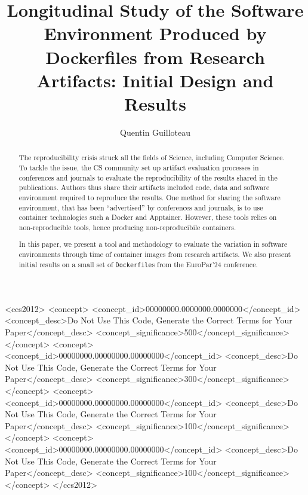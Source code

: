 \documentclass[sigconf,natbib=false]{acmart}
\newcommand{\df}{\texttt{Dockerfile}}
\begin{document}
\title{%
  Longitudinal Study of the Software Environment Produced by Dockerfiles from Research Artifacts: Initial Design and Results
}

\author{Quentin Guilloteau}


\begin{abstract}
  The reproducibility crisis struck all the fields of Science, including Computer Science.
  To tackle the issue, the CS community set up artifact evaluation processes in conferences and journals to evaluate the reproducibility of the results shared in the publications.
  Authors thus share their artifacts included code, data and software environment required to reproduce the results.
  One method for sharing the software environment, that has been ``advertised'' by conferences and journals, is to use container technologies such a Docker and Apptainer.
  However, these tools relies on non-reproducible tools, hence producing non-reproducibile containers.

  In this paper, we present a tool and methodology to evaluate the variation in software environments through time of container images from research artifacts.
  We also present initial results on a small set of \df s from the EuroPar'24 conference.
\end{abstract}

\begin{CCSXML}
<ccs2012>
 <concept>
  <concept_id>00000000.0000000.0000000</concept_id>
  <concept_desc>Do Not Use This Code, Generate the Correct Terms for Your Paper</concept_desc>
  <concept_significance>500</concept_significance>
 </concept>
 <concept>
  <concept_id>00000000.00000000.00000000</concept_id>
  <concept_desc>Do Not Use This Code, Generate the Correct Terms for Your Paper</concept_desc>
  <concept_significance>300</concept_significance>
 </concept>
 <concept>
  <concept_id>00000000.00000000.00000000</concept_id>
  <concept_desc>Do Not Use This Code, Generate the Correct Terms for Your Paper</concept_desc>
  <concept_significance>100</concept_significance>
 </concept>
 <concept>
  <concept_id>00000000.00000000.00000000</concept_id>
  <concept_desc>Do Not Use This Code, Generate the Correct Terms for Your Paper</concept_desc>
  <concept_significance>100</concept_significance>
 </concept>
</ccs2012>
\end{CCSXML}
\end{document}
